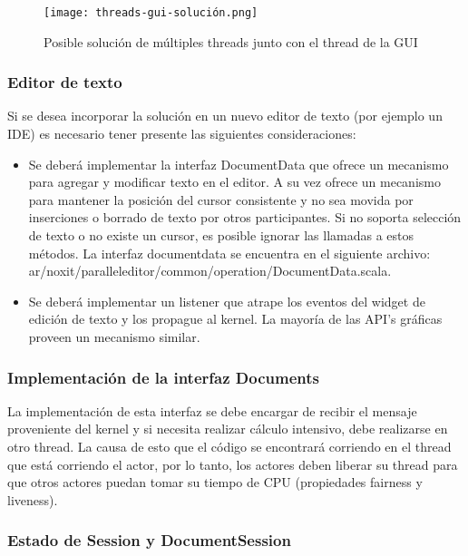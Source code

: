 \documentclass[12pt,a4paper]{article}
\begin{document}
	\begin{figure}[!ht]
		\begin{center}
			\texttt{[image: threads-gui-solución.png]}
			\caption{\label{threads-gui-solución} Posible solución de múltiples threads junto con el thread de la GUI }
		\end{center}
	\end{figure}

\subsubsection{Editor de texto}
Si se desea incorporar la solución en un nuevo editor de texto (por ejemplo un IDE) es necesario tener presente 
las siguientes consideraciones:

	\begin{itemize}
		\item Se deberá implementar la interfaz DocumentData que ofrece un mecanismo para agregar y modificar texto en el editor. 
		A su vez ofrece un mecanismo para mantener la posición del cursor consistente y no sea movida por inserciones o
		borrado de texto por otros participantes. Si no soporta selección de texto o no existe un cursor, es posible ignorar
		las llamadas a estos métodos.
		La interfaz documentdata se encuentra en el siguiente archivo: ar/noxit/paralleleditor/common/operation/DocumentData.scala.
		\item  Se deberá implementar un listener que atrape los eventos del widget de edición de texto y los propague al kernel.
		La mayoría de las API’s gráficas proveen un mecanismo similar.
	\end{itemize}


\subsubsection{Implementación de la interfaz Documents}
La implementación de esta interfaz se debe encargar de recibir el mensaje proveniente del kernel y si necesita realizar
cálculo intensivo, debe realizarse en otro thread. La causa de esto que el código se encontrará corriendo en el thread que
está corriendo el actor, por lo tanto, los actores deben liberar su thread para que otros actores puedan tomar su tiempo de CPU
(propiedades fairness y liveness).

\subsubsection{Estado de Session y DocumentSession}
\end{document}
